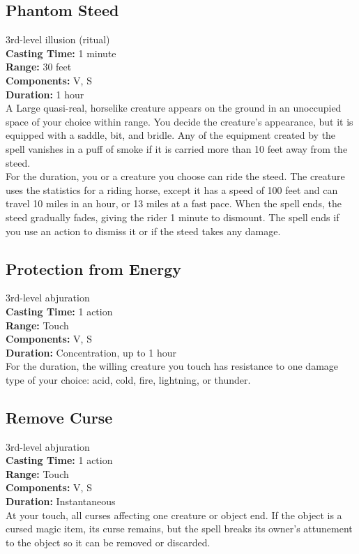 \documentclass[11pt, A4paper, english]{article}
\begin{document}
		\subsection{Phantom Steed}
3rd-level illusion (ritual) \\
\textbf{Casting Time:} 1 minute \\
\textbf{Range:} 30 feet \\
\textbf{Components:} V, S \\
\textbf{Duration:} 1 hour \\
A Large quasi-real, horselike creature appears on the ground in an unoccupied space of your choice within range. You decide the creature’s appearance, but it is equipped with a saddle, bit, and bridle. Any of the equipment created by the spell vanishes in a puff of smoke if it is carried more than 10 feet away from the steed. \\
For the duration, you or a creature you choose can ride the steed. The creature uses the statistics for a riding horse, except it has a speed of 100 feet and can travel 10 miles in an hour, or 13 miles at a fast pace. When the spell ends, the steed gradually fades, giving the rider 1 minute to dismount. The spell ends if you use an action to dismiss it or if the steed takes any damage.

		\subsection{Protection from Energy}
3rd-level abjuration \\
\textbf{Casting Time:} 1 action \\
\textbf{Range:} Touch \\
\textbf{Components:} V, S \\
\textbf{Duration:} Concentration, up to 1 hour \\
For the duration, the willing creature you touch has resistance to one damage type of your choice: acid, cold, fire, lightning, or thunder.

		\subsection{Remove Curse}
3rd-level abjuration \\
\textbf{Casting Time:} 1 action \\
\textbf{Range:} Touch \\
\textbf{Components:} V, S \\
\textbf{Duration:} Instantaneous \\
At your touch, all curses affecting one creature or object end. If the object is a cursed magic item, its curse remains, but the spell breaks its owner’s attunement to the object so it can be removed or discarded.
\end{document}
